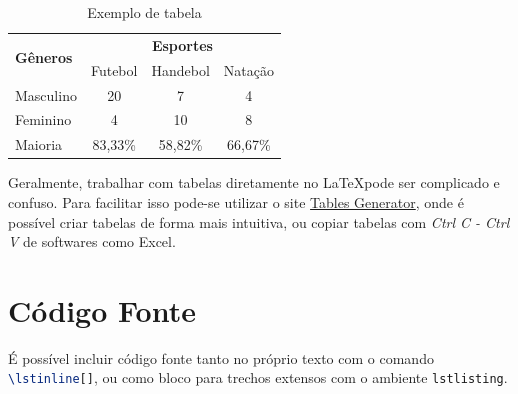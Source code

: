     \begin{table}[htb]
        \centering
        \caption{Exemplo de tabela}
        \label{tab:e7}
        \begin{tabular}{l|ccc}
            \hline
            \multirow{2}{*}{\textbf{Gêneros}} & \multicolumn{3}{c}{\textbf{Esportes}} \\ \cline{2-4} 
                                              & Futebol    & Handebol    & Natação    \\ \hline
            Masculino                         & 20         & 7           & 4          \\
            Feminino                          & 4          & 10          & 8          \\ \hline
            Maioria                           & 83,33\%    & 58,82\%     & 66,67\%    \\ \hline
            \end{tabular}
    \end{table}

    Geralmente, trabalhar com tabelas diretamente no \LaTeX pode ser complicado e confuso.
    Para facilitar isso pode-se utilizar o site \href{https://www.tablesgenerator.com}{Tables Generator}, onde é possível criar tabelas de forma mais intuitiva, ou copiar tabelas com \textit{Ctrl C - Ctrl V} de softwares como Excel.


\section{Código Fonte}
\label{sec:codigo}

    É possível incluir código fonte tanto no próprio texto com o comando \lstinline[language=TeX,style=Code]|\lstinline[]|, ou como bloco para trechos extensos com o ambiente \lstinline[language=TeX,style=Code]|lstlisting|.


